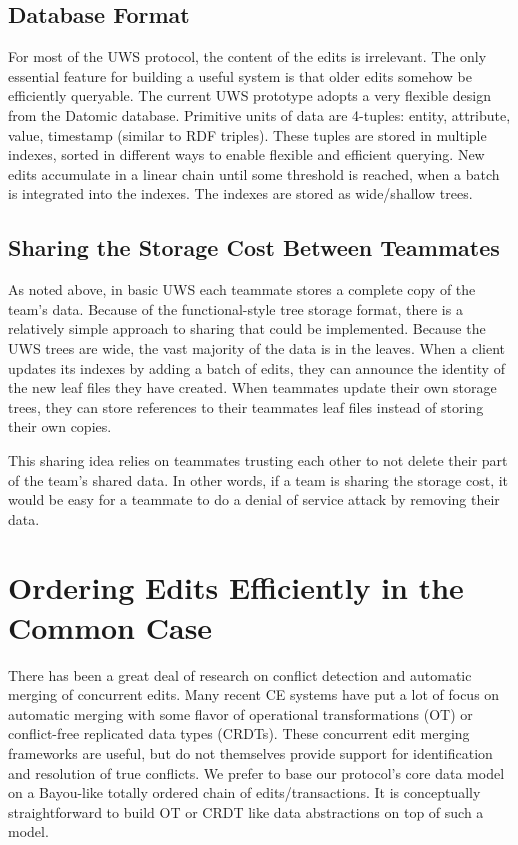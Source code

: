 \documentclass[runningheads]{llncs}
\begin{document}
\subsection{Database Format}

For most of the UWS protocol, the content of the edits is irrelevant.
The only essential feature for building a useful system is that older edits somehow be efficiently queryable.
The current UWS prototype adopts a very flexible design from the Datomic database.
Primitive units of data are 4-tuples: entity, attribute, value, timestamp (similar to RDF triples).
These tuples are stored in multiple indexes, sorted in different ways to enable flexible and efficient querying.
New edits accumulate in a linear chain until some threshold is reached, when a batch is integrated into the indexes.
The indexes are stored as wide{\slash}shallow trees.

\subsection{Sharing the Storage Cost Between Teammates}

As noted above, in basic UWS each teammate stores a complete copy of the team's data.
Because of the functional-style tree storage format, there is a relatively simple approach to sharing that could be implemented.
Because the UWS trees are wide, the vast majority of the data is in the leaves.
When a client updates its indexes by adding a batch of edits, they can announce the identity of the new leaf files they have created.
When teammates update their own storage trees, they can store references to their teammates leaf files instead of storing their own copies.

This sharing idea relies on teammates trusting each other to not delete their part of the team's shared data.
In other words, if a team is sharing the storage cost, it would be easy for a teammate to do a denial of service attack by removing their data.

\section{Ordering Edits Efficiently in the Common Case}

There has been a great deal of research on conflict detection and automatic merging of concurrent edits.
Many recent CE systems have put a lot of focus on automatic merging with some flavor of operational transformations (OT) or conflict-free replicated data types (CRDTs).
These concurrent edit merging frameworks are useful, but do not themselves provide support for identification and resolution of true conflicts.
We prefer to base our protocol's core data model on a Bayou-like totally ordered chain of edits{\slash}transactions.
It is conceptually straightforward to build OT or CRDT like data abstractions on top of such a model.
\end{document}
